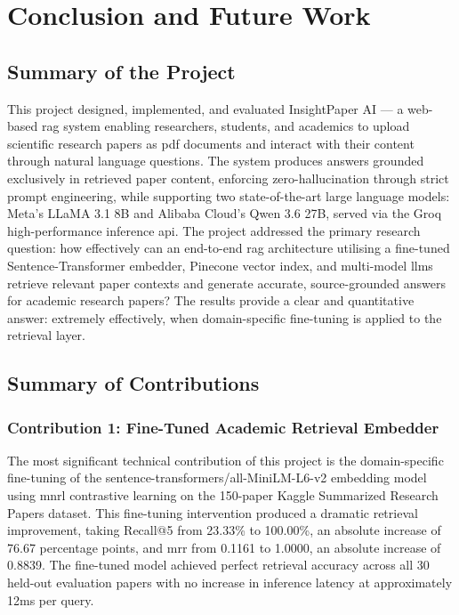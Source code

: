 \chapter{Conclusion and Future Work}

\section{Summary of the Project}

This project designed, implemented, and evaluated InsightPaper AI — a web-based \gls{rag} system enabling researchers, students, and academics to upload scientific research papers as \gls{pdf} documents and interact with their content through natural language questions. The system produces answers grounded exclusively in retrieved paper content, enforcing zero-hallucination through strict prompt engineering, while supporting two state-of-the-art large language models: Meta's LLaMA 3.1 8B and Alibaba Cloud's Qwen 3.6 27B, served via the Groq high-performance inference \gls{api}.
\newline \newline The project addressed the primary research question: how effectively can an end-to-end \gls{rag} architecture utilising a fine-tuned Sentence-Transformer embedder, Pinecone vector index, and multi-model \gls{llm}s retrieve relevant paper contexts and generate accurate, source-grounded answers for academic research papers? The results provide a clear and quantitative answer: extremely effectively, when domain-specific fine-tuning is applied to the retrieval layer.

\section{Summary of Contributions}

\subsection{Contribution 1: Fine-Tuned Academic Retrieval Embedder}

The most significant technical contribution of this project is the domain-specific fine-tuning of the sentence-transformers/all-MiniLM-L6-v2 embedding model using \gls{mnrl} contrastive learning on the 150-paper Kaggle Summarized Research Papers dataset. This fine-tuning intervention produced a dramatic retrieval improvement, taking Recall@5 from 23.33\% to 100.00\%, an absolute increase of 76.67 percentage points, and \gls{mrr} from 0.1161 to 1.0000, an absolute increase of 0.8839. The fine-tuned model achieved perfect retrieval accuracy across all 30 held-out evaluation papers with no increase in inference latency at approximately 12ms per query.

